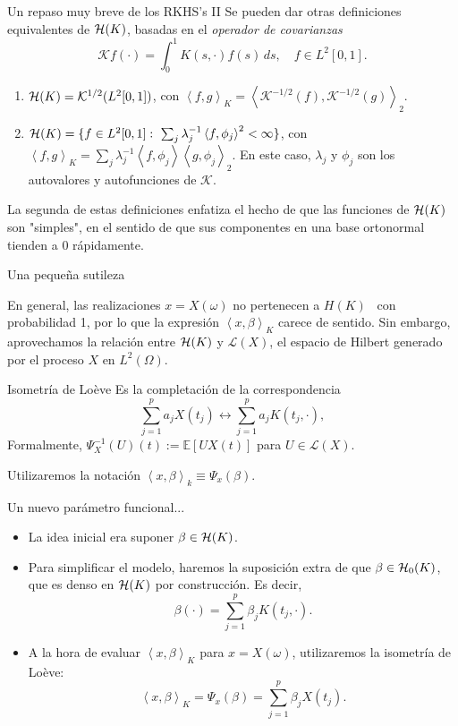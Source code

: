 \documentclass[10pt, spanish, professionalfonts]{beamer}
\newcommand\maroon[1]{\color{mLightBrown}#1\color{black}}
\newcommand{\E}{\mathbb{E}}
\newcommand{\Hcal}{\ensuremath\mathcal{H}}
\newcommand\dotprod[2]{\left\langle #1, #2 \right\rangle}
\begin{document}
\begin{frame}{Un repaso muy breve de los RKHS's II}
Se pueden dar otras definiciones equivalentes de \(\Hcal(K)\), basadas en el \textit{operador de covarianzas}
\[
\mathcal Kf(\cdot) = \int_0^1 K(s, \cdot)f(s)\, ds, \quad f\in L^2[0, 1].
\]

\begin{definition}
\begin{enumerate}
  \item  \(\Hcal(K) = \mathcal K^{1/2}(L^2[0, 1])\), con \(\dotprod{f}{g}_K = \dotprod{\mathcal K^{-1/2}(f)}{\mathcal K^{-1/2}(g)}_2\).
  \item \(\Hcal(K) = \{f \in L^2[0, 1]: \ \sum_j \lambda_j^{-1}\dotprod{f}{\phi_j}^2 < \infty \}\), con \(\dotprod{f}{g}_K = \sum_j \lambda_j^{-1}\dotprod{f}{\phi_j}\dotprod{g}{\phi_j}_2\). En este caso, \(\lambda_j\) y \(\phi_j\) son los autovalores y autofunciones de \(\mathcal K\).
\end{enumerate}
\end{definition}

La segunda de estas definiciones enfatiza el hecho de que las funciones de \(\Hcal(K)\) son "simples", en el sentido de que sus componentes en una base ortonormal tienden a \(0\) rápidamente.

\end{frame}

\begin{frame}{Una pequeña sutileza}

  En general, las realizaciones \(x=X(\omega)\) \maroon{no pertenecen a \(H(K)\)} \ con probabilidad 1, por lo que la expresión \(\dotprod{x}{\beta}_K\) carece de sentido. Sin embargo, aprovechamos la relación entre \(\Hcal(K)\) y \(\mathcal L(X)\), el espacio de Hilbert generado por el proceso \(X\) en \(L^2(\Omega)\).
  \begin{block}{Isometría de Loève}
    Es la completación de la correspondencia
    \[
\sum_{j=1}^p a_j X(t_j) \longleftrightarrow \sum_{j=1}^p a_j K(t_j, \cdot),
    \]
    Formalmente, \(\Psi^{-1}_X(U)(t) := \E[U X(t)]\) para \(U \in \mathcal L(X)\).
  \end{block}
  Utilizaremos la notación \maroon{\(\dotprod{x}{\beta}_k \equiv \Psi_x(\beta)\)}.
\end{frame}



\begin{frame}{Un nuevo parámetro funcional...}
  \begin{itemize}
    \item La idea inicial era suponer \(\beta \in \Hcal(K)\).
    \item Para simplificar el modelo, haremos la suposición extra de que \(\beta \in \Hcal_0(K)\), que es denso en \(\Hcal(K)\) por construcción. Es decir,
    \[
      \beta(\cdot) = \sum_{j=1}^p \beta_j K(t_j, \cdot).
    \]
    \item A la hora de evaluar \(\dotprod{x}{\beta}_K\) para \(x=X(\omega)\), utilizaremos la isometría de Loève:
    \[
      \dotprod{x}{\beta}_K = \Psi_x(\beta) = \sum_{j=1}^p \beta_j X(t_j).
    \]
  \end{itemize}

\end{frame}
\end{document}
